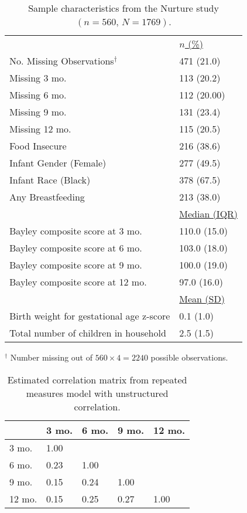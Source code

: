 \documentclass[useAMS,11pt]{article}
\newcommand{\1}{\mathbbm{1}}
\begin{document}
\begin{table}[!htb]
\caption{\label{tab:t1} Sample characteristics from the Nurture study $(n=560,\,N=1769)$.}
\begin{center}
\begin{tabular}{@{}ll@{}}
\toprule
& \underline{$n$ (\%)}\\
No. Missing Observations$^{\dagger}$ & 471 (21.0)\\
Missing 3 mo. & 113 (20.2) \\
Missing 6 mo. & 112 (20.00) \\
Missing 9 mo. & 131 (23.4) \\
Missing 12 mo. & 115 (20.5) \\
Food Insecure & 216 (38.6) \\
Infant Gender (Female)  & 277 (49.5) \\
Infant Race (Black)  & 378 (67.5) \\
Any Breastfeeding & 213 (38.0) \\[6pt]
& \underline{Median (IQR)}\\
Bayley composite score at 3 mo. & 110.0 (15.0) \\
Bayley composite score at 6 mo. & 103.0 (18.0) \\
Bayley composite score at 9 mo. & 100.0 (19.0) \\
Bayley composite score at 12 mo. & 97.0 (16.0) \\[6pt]
& \underline{Mean (SD)}\\
Birth weight for gestational age z-score & 0.1 (1.0) \\
Total number of children in household & 2.5 (1.5) \\ \bottomrule
\end{tabular}
\end{center}\vspace{-1em}
\hspace{1.85in}$^{\dagger}$ Number missing out of $560\times 4=2240$ possible observations.
\end{table}

\begin{table}[!htb]
\centering
\caption{\label{tab:cor_mat} Estimated correlation matrix from repeated measures model with unstructured correlation.}
\begin{tabular}{l|llll}
 & 3 mo. & 6 mo. & 9 mo. & 12 mo. \\ \hline
3 mo. & 1.00  &  &  &  \\
6 mo. & 0.23 &  1.00 &  &  \\
9 mo. & 0.15 & 0.24 &  1.00 &  \\
12 mo. & 0.15 & 0.25 & 0.27 & 1.00
\end{tabular}
\end{table}
\end{document}

